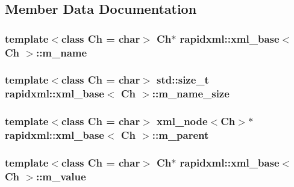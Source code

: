\subsection{Member Data Documentation}
\hypertarget{classrapidxml_1_1xml__base_afd9851ed43e14619db0d7075ef8e9e8a}{
\subsubsection[{m\+\_\+name}]{\setlength{\rightskip}{0pt plus 5cm}template$<$class Ch  = char$>$ Ch$\ast$ {\bf rapidxml\+::xml\+\_\+base}$<$ Ch $>$\+::m\+\_\+name\hspace{0.3cm}{\ttfamily [protected]}}}\label{classrapidxml_1_1xml__base_afd9851ed43e14619db0d7075ef8e9e8a}
\hypertarget{classrapidxml_1_1xml__base_a5a8c76a7274b4180213796422c4df76f}{
\subsubsection[{m\+\_\+name\+\_\+size}]{\setlength{\rightskip}{0pt plus 5cm}template$<$class Ch  = char$>$ std\+::size\+\_\+t {\bf rapidxml\+::xml\+\_\+base}$<$ Ch $>$\+::m\+\_\+name\+\_\+size\hspace{0.3cm}{\ttfamily [protected]}}}\label{classrapidxml_1_1xml__base_a5a8c76a7274b4180213796422c4df76f}
\hypertarget{classrapidxml_1_1xml__base_a90d5f660f078f66563fd7b2d8387ccb0}{
\subsubsection[{m\+\_\+parent}]{\setlength{\rightskip}{0pt plus 5cm}template$<$class Ch  = char$>$ {\bf xml\+\_\+node}$<$Ch$>$$\ast$ {\bf rapidxml\+::xml\+\_\+base}$<$ Ch $>$\+::m\+\_\+parent\hspace{0.3cm}{\ttfamily [protected]}}}\label{classrapidxml_1_1xml__base_a90d5f660f078f66563fd7b2d8387ccb0}
\hypertarget{classrapidxml_1_1xml__base_a278a1ea63b0b70219b946cec47fa00ea}{
\subsubsection[{m\+\_\+value}]{\setlength{\rightskip}{0pt plus 5cm}template$<$class Ch  = char$>$ Ch$\ast$ {\bf rapidxml\+::xml\+\_\+base}$<$ Ch $>$\+::m\+\_\+value\hspace{0.3cm}{\ttfamily [protected]}}}\label{classrapidxml_1_1xml__base_a278a1ea63b0b70219b946cec47fa00ea}
